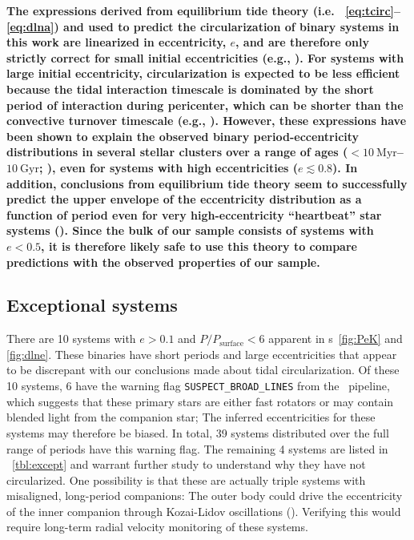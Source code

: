 \documentclass[modern, letterpaper]{aastex62}
\newcommand{\apogee}{\project{\acronym{APOGEE}}}
\newcommand{\Psurf}{\ensuremath{P_\textrm{surface}}}
\renewcommand{\changes}[1]{\textbf{#1}}
\begin{document}

\changes{
The expressions derived from equilibrium tide theory (i.e. \eqname~\ref{eq:tcirc}--\ref{eq:dlna}) and used to predict the circularization of binary systems in this work are linearized in eccentricity, $e$, and are therefore only strictly correct for small initial eccentricities (e.g., \citealt{Zahn:1989, Mazeh:2007}).
For systems with large initial eccentricity, circularization is expected to be less efficient because the tidal interaction timescale is dominated by the short period of interaction during pericenter, which can be shorter than the convective turnover timescale (e.g., \citealt{Goldman:1991, Goldman:1994, Goodman:1997}).
However, these expressions have been shown to explain the observed binary period-eccentricity distributions in several stellar clusters over a range of ages ($<10~\textrm{Myr}$--$10~\textrm{Gyr}$; \citealt{Meibom:2005}), even for systems with high eccentricities ($e \lesssim 0.8$).
In addition, conclusions from equilibrium tide theory seem to successfully predict the upper envelope of the eccentricity distribution as a function of period even for very high-eccentricity ``heartbeat'' star systems (\citealt{Shporer:2016}).
Since the bulk of our sample consists of systems with $e < 0.5$, it is therefore likely safe to use this theory to compare predictions with the observed properties of our sample.
}

\subsection{Exceptional systems}

There are 10 systems with $e > 0.1$ and $P/\Psurf < 6$ apparent in \figurename
s~\ref{fig:PeK} and \ref{fig:dlne}.
These binaries have short periods and large eccentricities that appear to be
discrepant with our conclusions made about tidal circularization.
Of these 10 systems, 6 have the warning flag \texttt{SUSPECT\_BROAD\_LINES} from
the \apogee\ pipeline, which suggests that these primary stars are either fast
rotators or may contain blended light from the companion star; The inferred
eccentricities for these systems may therefore be biased.
In total, 39 systems distributed over the full range of periods have this
warning flag.
The remaining 4 systems are listed in \tablename~\ref{tbl:except} and warrant
further study to understand why they have not circularized.
One possibility is that these are actually triple systems with misaligned,
long-period companions: The outer body could drive the eccentricity of the inner
companion through Kozai-Lidov oscillations (\citealt{Kozai:1962, Lidov:1962}).
Verifying this would require long-term radial velocity monitoring of these
systems.
\end{document}

